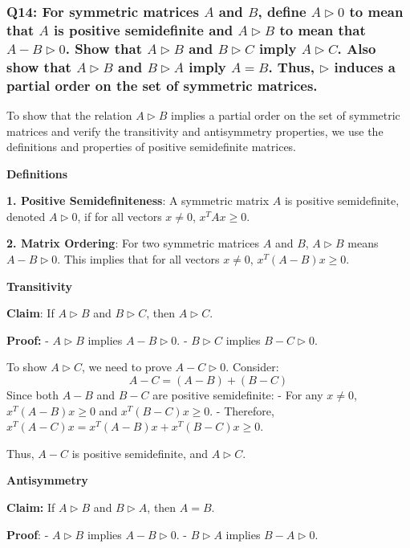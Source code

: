 \documentclass[8pt]{article}
\begin{document}
{{\subsubsection*{Q14: For symmetric matrices \(A\) and \(B\), define \(A \triangleright 0\) to mean that \(A\) is positive semidefinite and \(A \triangleright B\) to mean that \(A - B \triangleright 0\). Show that \(A \triangleright B\) and \(B \triangleright C\) imply \(A \triangleright C\). Also show that \(A \triangleright B\) and \(B \triangleright A\) imply \(A = B\). Thus, \(\triangleright\) induces a partial order on the set of symmetric matrices.}

To show that the relation \(A \triangleright B\) implies a partial order on the set of symmetric matrices and verify the transitivity and antisymmetry properties, we use the definitions and properties of positive semidefinite matrices.

\textbf{Definitions}

\textbf{1. Positive Semidefiniteness}:
   A symmetric matrix \(A\) is positive semidefinite, denoted \(A \triangleright 0\), if for all vectors \(x \neq 0\), \(x^T A x \geq 0\).

\textbf{2. Matrix Ordering}:
   For two symmetric matrices \(A\) and \(B\), \(A \triangleright B\) means \(A - B \triangleright 0\). This implies that for all vectors \(x \neq 0\), \(x^T (A - B) x \geq 0\).

\textbf{Transitivity}

\textbf{Claim}: If \(A \triangleright B\) and \(B \triangleright C\), then \(A \triangleright C\).

\textbf{Proof:}
- \(A \triangleright B\) implies \(A - B \triangleright 0\).
- \(B \triangleright C\) implies \(B - C \triangleright 0\).
  
To show \(A \triangleright C\), we need to prove \(A - C \triangleright 0\). Consider:
\[
A - C = (A - B) + (B - C)
\]
Since both \(A - B\) and \(B - C\) are positive semidefinite:
- For any \(x \neq 0\), \(x^T (A - B) x \geq 0\) and \(x^T (B - C) x \geq 0\).
- Therefore, \(x^T (A - C) x = x^T (A - B) x + x^T (B - C) x \geq 0\).

Thus, \(A - C\) is positive semidefinite, and \(A \triangleright C\).

\textbf{Antisymmetry}

\textbf{Claim:} If \(A \triangleright B\) and \(B \triangleright A\), then \(A = B\).

\textbf{Proof}:
- \(A \triangleright B\) implies \(A - B \triangleright 0\).
- \(B \triangleright A\) implies \(B - A \triangleright 0\).

}}
\end{document}
